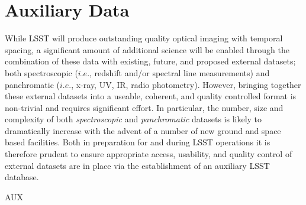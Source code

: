\section{Auxiliary Data}\label{sec:tasks:aux}  
{\justify
While LSST will produce outstanding quality optical imaging with temporal spacing, a significant amount of additional science will be enabled through the combination of these data with existing, future, and proposed external datasets; both spectroscopic ($i.e.$, redshift and/or spectral line measurements) and panchromatic ($i.e.$, x-ray, UV, IR, radio photometry). However, bringing together these external datasets into a useable, coherent, and quality controlled format is non-trivial and requires significant effort. In particular, the number, size and complexity of both {\it spectroscopic} and {\it panchromatic} datasets is likely to dramatically increase with the advent of a number of new ground and space based facilities. Both in preparation for and during LSST operations it is therefore prudent to ensure appropriate access, usability, and quality control of external datasets are in place via the establishment of an auxiliary LSST database.



\begin{tasklist}{AUX}

\end{tasklist}}
